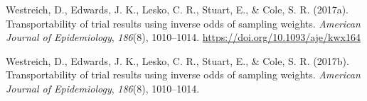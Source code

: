 \documentclass[
  single column]{article}
\newlength{\cslhangindent}
\newenvironment{CSLReferences}[2] %
 {\begin{list}{}{%
  \setlength{\itemindent}{0pt}
  \setlength{\leftmargin}{0pt}
  \setlength{\parsep}{0pt}
  \ifodd #1
   \setlength{\leftmargin}{\cslhangindent}
   \setlength{\itemindent}{-1\cslhangindent}
  \fi
  \setlength{\itemsep}{#2\baselineskip}}}
 {\end{list}}
\begin{document}
\begin{CSLReferences}{1}{0}
Westreich, D., Edwards, J. K., Lesko, C. R., Stuart, E., \& Cole, S. R.
(2017a). Transportability of trial results using inverse odds of
sampling weights. \emph{American Journal of Epidemiology},
\emph{186}(8), 1010--1014. \url{https://doi.org/10.1093/aje/kwx164}

Westreich, D., Edwards, J. K., Lesko, C. R., Stuart, E., \& Cole, S. R.
(2017b). Transportability of trial results using inverse odds of
sampling weights. \emph{American Journal of Epidemiology},
\emph{186}(8), 1010--1014.

\end{CSLReferences}
\end{document}
